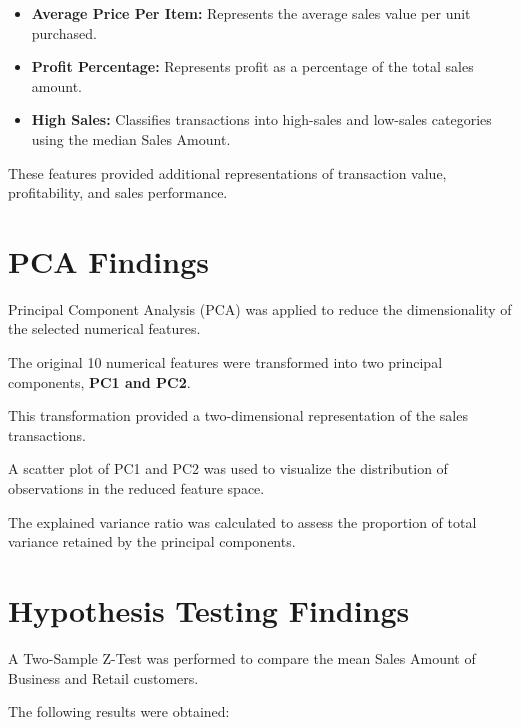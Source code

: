 \documentclass[12pt,a4paper]{report}
\begin{document}
\begin{itemize}

    \item \textbf{Average Price Per Item:}
    Represents the average sales
    value per unit purchased.

    \item \textbf{Profit Percentage:}
    Represents profit as a percentage
    of the total sales amount.

    \item \textbf{High Sales:}
    Classifies transactions into
    high-sales and low-sales
    categories using the median
    Sales Amount.

\end{itemize}

These features provided additional
representations of transaction
value, profitability, and
sales performance.


\section{PCA Findings}

Principal Component Analysis (PCA)
was applied to reduce the
dimensionality of the selected
numerical features.

The original 10 numerical features
were transformed into two
principal components,
\textbf{PC1 and PC2}.

This transformation provided
a two-dimensional representation
of the sales transactions.

A scatter plot of PC1 and PC2
was used to visualize the
distribution of observations
in the reduced feature space.

The explained variance ratio
was calculated to assess
the proportion of total
variance retained by
the principal components.


\section{Hypothesis Testing Findings}

A Two-Sample Z-Test was performed
to compare the mean Sales Amount
of Business and Retail customers.

The following results were obtained:
\end{document}
